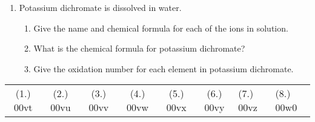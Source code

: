 \begin{eocexercises}{}
\begin{enumerate}
\item{Potassium dichromate is dissolved in water.}
\begin{enumerate}
\item{Give the name and chemical formula for each of the ions in solution.}
\item{What is the chemical formula for potassium dichromate?}
\item{Give the oxidation number for each element in potassium dichromate.}
\end{enumerate}

\end{enumerate}

\practiceinfo

\begin{tabular}[h]{cccccc}
(1.) 00vt & (2.) 00vu & (3.) 00vv & (4.) 00vw & (5.) 00vx & (6.) 00vy & (7.) 00vz & (8.) 00w0 & 
 \end{tabular}
\end{eocexercises}









